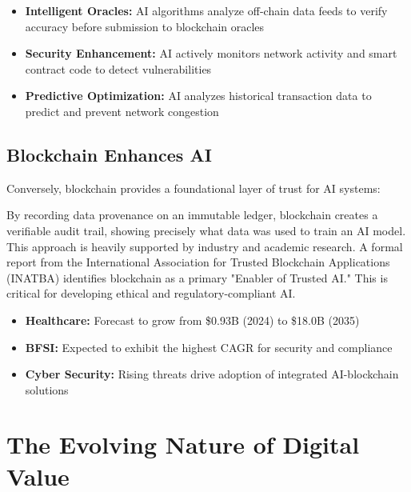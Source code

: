 \documentclass[11pt,a4paper]{report}
\begin{document}
\begin{itemize}
    \item \textbf{Intelligent Oracles:} AI algorithms analyze off-chain data feeds to verify accuracy before submission to blockchain oracles
    \item \textbf{Security Enhancement:} AI actively monitors network activity and smart contract code to detect vulnerabilities
    \item \textbf{Predictive Optimization:} AI analyzes historical transaction data to predict and prevent network congestion
\end{itemize}

\subsection{Blockchain Enhances AI}

Conversely, blockchain provides a foundational layer of trust for AI systems:

\begin{keypoint}
By recording data provenance on an immutable ledger, blockchain creates a verifiable audit trail, showing precisely what data was used to train an AI model. This approach is heavily supported by industry and academic research. A formal report from the International Association for Trusted Blockchain Applications (INATBA) identifies blockchain as a primary "Enabler of Trusted AI." This is critical for developing ethical and regulatory-compliant AI.
\end{keypoint}

\begin{marketfigure}
\begin{itemize}
    \item \textbf{Healthcare:} Forecast to grow from \$0.93B (2024) to \$18.0B (2035)
    \item \textbf{BFSI:} Expected to exhibit the highest CAGR for security and compliance
    \item \textbf{Cyber Security:} Rising threats drive adoption of integrated AI-blockchain solutions
\end{itemize}
\end{marketfigure}

\section{The Evolving Nature of Digital Value}
\end{document}
